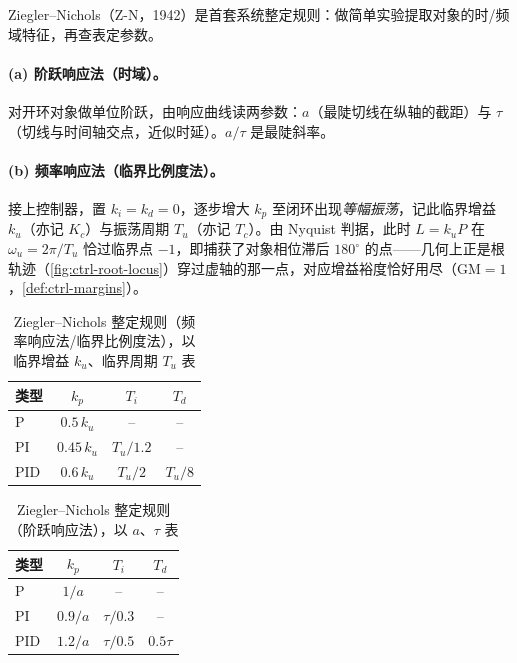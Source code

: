 Ziegler--Nichols（Z-N，1942\cite{ziegler1942optimum}）是首套系统整定规则：做简单实验提取对象的时/频域特征，再查表定参数。

\paragraph{(a) 阶跃响应法（时域）。}
对开环对象做单位阶跃，由响应曲线读两参数：$a$（最陡切线在纵轴的截距）与 $\tau$（切线与时间轴交点，近似时延）。$a/\tau$ 是最陡斜率。

\paragraph{(b) 频率响应法（临界比例度法）。}
接上控制器，置 $k_i=k_d=0$，逐步增大 $k_p$ 至闭环出现\emph{等幅振荡}，记此临界增益 $k_u$（亦记 $K_c$）与振荡周期 $T_u$（亦记 $T_c$）。由 Nyquist 判据，此时 $L=k_uP$ 在 $\omega_u=2\pi/T_u$ 恰过临界点 $-1$，即捕获了对象相位滞后 $180^\circ$ 的点——几何上正是根轨迹（\cref{fig:ctrl-root-locus}）穿过虚轴的那一点，对应增益裕度恰好用尽（$\mathrm{GM}=1$，\cref{def:ctrl-margins}）。

\begin{table}[H]\centering\small
\caption{Ziegler--Nichols 整定规则（频率响应法/临界比例度法），以临界增益 $k_u$、临界周期 $T_u$ 表}
\label{tab:ctrl-zn-freq}
\begin{tabular}{lccc}
\toprule
类型 & $k_p$ & $T_i$ & $T_d$ \\
\midrule
P   & $0.5\,k_u$  & --        & --        \\
PI  & $0.45\,k_u$ & $T_u/1.2$ & --        \\
PID & $0.6\,k_u$  & $T_u/2$   & $T_u/8$   \\
\bottomrule
\end{tabular}
\end{table}

\begin{table}[H]\centering\small
\caption{Ziegler--Nichols 整定规则（阶跃响应法），以 $a$、$\tau$ 表}
\label{tab:ctrl-zn-step}
\begin{tabular}{lccc}
\toprule
类型 & $k_p$ & $T_i$ & $T_d$ \\
\midrule
P   & $1/a$   & --          & --        \\
PI  & $0.9/a$ & $\tau/0.3$  & --        \\
PID & $1.2/a$ & $\tau/0.5$  & $0.5\tau$ \\
\bottomrule
\end{tabular}
\end{table}

